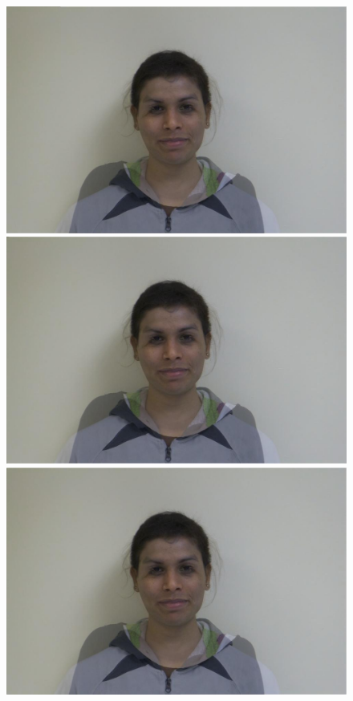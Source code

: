 \documentclass[11pt]{article}
\begin{document}
\begin{figure}[H]
\begin{center}
\includegraphics[scale=0.06]{figs/frames/morph_steinkirch_tangatur_31.jpg} 
\includegraphics[scale=0.06]{figs/frames/morph_steinkirch_tangatur_32.jpg} 
\includegraphics[scale=0.06]{figs/frames/morph_steinkirch_tangatur_33.jpg} 

\end{center}
\end{figure}
\end{document}
